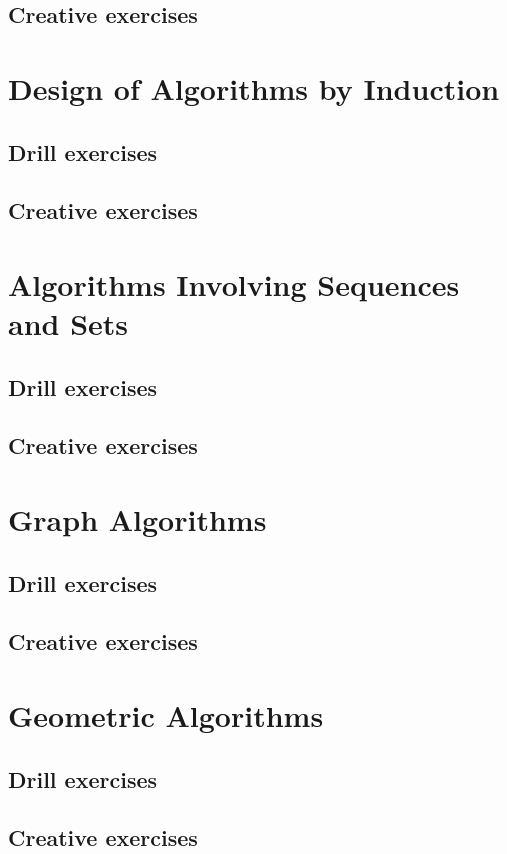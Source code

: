 \documentclass[a4paper,11pt]{memoir}
\begin{document}
    \section{Creative exercises}
    
    \chapter{Design of Algorithms by Induction}
    \section{Drill exercises}
    \section{Creative exercises}
    
    \chapter{Algorithms Involving Sequences and Sets}
    \section{Drill exercises}
    \section{Creative exercises}
    
    \chapter{Graph Algorithms}
    \section{Drill exercises}
    \section{Creative exercises}
    
    \chapter{Geometric Algorithms}
    \section{Drill exercises}
    \section{Creative exercises}
    
\end{document}
